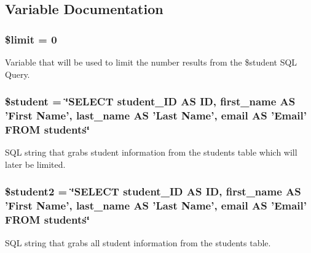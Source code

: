 \subsection{\-Variable \-Documentation}
\hypertarget{rmStudent_8php_ae05862a0294251c88629b141b5ce329a}{
\subsubsection[{\$limit}]{\setlength{\rightskip}{0pt plus 5cm}\$limit = 0}}\label{rmStudent_8php_ae05862a0294251c88629b141b5ce329a}
\-Variable that will be used to limit the number results from the \$student \-S\-Q\-L \-Query. \hypertarget{rmStudent_8php_a5a5a2522ab0ea5c503744aa937fac0e2}{
\subsubsection[{\$student}]{\setlength{\rightskip}{0pt plus 5cm}\$student = \char`\"{}\-S\-E\-L\-E\-C\-T student\-\_\-\-I\-D \-A\-S \-I\-D, first\-\_\-name \-A\-S '\-First \-Name', last\-\_\-name \-A\-S '\-Last \-Name', email \-A\-S '\-Email' \-F\-R\-O\-M students\char`\"{}}}\label{rmStudent_8php_a5a5a2522ab0ea5c503744aa937fac0e2}
\-S\-Q\-L string that grabs student information from the students table which will later be limited. \hypertarget{rmStudent_8php_ab33f3ff56807c01248a10bae610fc52a}{
\subsubsection[{\$student2}]{\setlength{\rightskip}{0pt plus 5cm}\$student2 = \char`\"{}\-S\-E\-L\-E\-C\-T student\-\_\-\-I\-D \-A\-S \-I\-D, first\-\_\-name \-A\-S '\-First \-Name', last\-\_\-name \-A\-S '\-Last \-Name', email \-A\-S '\-Email' \-F\-R\-O\-M students\char`\"{}}}\label{rmStudent_8php_ab33f3ff56807c01248a10bae610fc52a}
\-S\-Q\-L string that grabs all student information from the students table. 